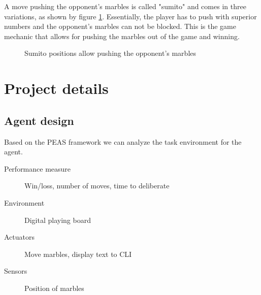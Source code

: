 \documentclass{llncs}
\begin{document}
A move pushing the opponent's marbles is called "sumito" and comes in three variations, as shown by figure \ref{sumito}. Essentially, the player has to push with superior numbers and the opponent's marbles can not be blocked. This is the game mechanic that allows for pushing the marbles out of the game and winning.

\begin{figure}[!h]
  \centering
  \hfill
  \hfill
  \caption{Sumito positions allow pushing the opponent's marbles \cite{abalone_sa_abalone_nodate}}
  \label{sumito}
\end{figure}

\section{Project details}

\subsection{Agent design}

Based on the PEAS framework we can analyze the task environment for the agent. \cite[p.107]{russell_artificial_2021}

\begin{description}
  \item[Performance measure] Win/loss, number of moves, time to deliberate
  \item[Environment] Digital playing board
  \item[Actuators] Move marbles, display text to CLI
  \item[Sensors] Position of marbles
\end{description}
\end{document}

